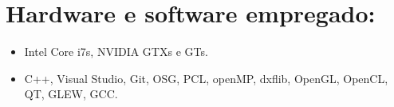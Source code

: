 %
%

\section*{Hardware e software empregado:}

\begin{itemize}
\item Intel Core i7s, NVIDIA GTXs e GTs.
\item C++, Visual Studio, Git, OSG, PCL, openMP, dxflib, OpenGL, OpenCL, QT, GLEW, GCC.
\end{itemize}


